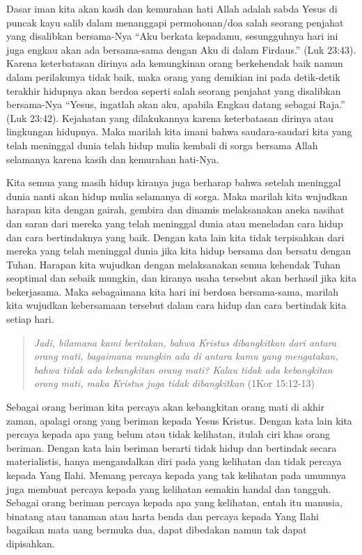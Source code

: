 \documentclass[a5paper,headsepline,titlepage,11pt,nnormalheadings,DIVcalc]{scrbook}
\begin{document}
Dasar iman kita akan kasih dan kemurahan hati Allah adalah sabda Yesus di puncak kayu salib dalam menanggapi permohonan/doa salah seorang penjahat yang disalibkan bersama-Nya ``Aku berkata kepadamu, sesungguhnya hari ini juga engkau akan ada bersama-sama dengan Aku di dalam Firdaus.'' (Luk 23:43). Karena keterbatasan dirinya ada kemungkinan orang berkehendak baik namun dalam perilakunya tidak baik, maka orang yang demikian ini pada detik-detik terakhir hidupnya akan berdoa seperti salah seorang penjahat yang disalibkan bersama-Nya ``Yesus, ingatlah akan aku, apabila Engkau datang sebagai Raja.'' (Luk 23:42). Kejahatan yang dilakukannya karena keterbatasan dirinya atau lingkungan hidupnya. Maka marilah kita imani bahwa saudara-saudari kita yang telah meninggal dunia telah hidup mulia kembali di sorga bersama Allah selamanya karena kasih dan kemurahan hati-Nya.

Kita semua yang masih hidup kiranya juga berharap bahwa setelah meninggal dunia nanti akan hidup mulia selamanya di sorga. Maka marilah kita wujudkan harapan kita dengan gairah, gembira dan dinamis melaksanakan aneka nasihat dan saran dari mereka yang telah meninggal dunia atau meneladan cara hidup dan cara bertindaknya yang baik. Dengan kata lain kita tidak terpisahkan dari mereka yang telah meninggal dunia jika kita hidup bersama dan bersatu dengan Tuhan. Harapan kita wujudkan dengan melaksanakan semua kehendak Tuhan seoptimal dan sebaik mungkin, dan kiranya usaha tersebut akan berhasil jika kita bekerjasama. Maka sebagaimana kita hari ini berdosa bersama-sama, marilah kita wujudkan kebersamaan tersebut dalam cara hidup dan cara bertindak kita setiap hari.

\begin{quote}
\textit{Jadi, bilamana kami beritakan, bahwa Kristus dibangkitkan dari antara orang mati, bagaimana mungkin ada di antara kamu yang mengatakan, bahwa tidak ada kebangkitan orang mati? Kalau tidak ada kebangkitan orang mati, maka Kristus juga tidak dibangkitkan} (1Kor 15:12-13)
\end{quote}

Sebagai orang beriman kita percaya akan kebangkitan orang mati di akhir zaman, apalagi orang yang beriman kepada Yesus Kristus. Dengan kata lain kita percaya kepada apa yang belum atau tidak kelihatan, itulah ciri khas orang beriman. Dengan kata lain beriman berarti tidak hidup dan bertindak secara materialistis, hanya mengandalkan diri pada yang kelihatan dan tidak percaya kepada Yang Ilahi. Memang percaya kepada yang tak kelihatan pada umumnya juga membuat percaya kepada yang kelihatan semakin handal dan tangguh. Sebagai orang beriman percaya kepada apa yang kelihatan, entah itu manusia, binatang atau tanaman atau harta benda dan percaya kepada Yang Ilahi bagaikan mata uang bermuka dua, dapat dibedakan namun tak dapat dipisahkan.
\end{document}
